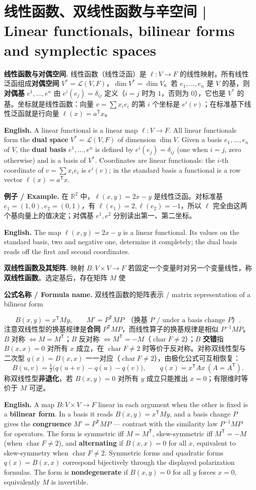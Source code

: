 \documentclass[UTF8,11pt,a4paper]{ctexart}
\newcommand{\EN}[1]{\par\noindent\textbf{English.} #1\par}
\newcommand{\FORMULA}[2]{\par\noindent\textbf{公式名称 / Formula name.} #1 / #2\par}
\newcommand{\EX}[2]{\par\noindent\textbf{例子 / Example.} #1\par\EN{#2}}
\begin{document}
\section[线性函数与辛空间]{线性函数、双线性函数与辛空间 | Linear functionals, bilinear forms and symplectic spaces}
\noindent\textbf{线性函数与对偶空间.} 线性函数（线性泛函）是 $\ell:V\to F$ 的线性映射。所有线性泛函组成\textbf{对偶空间} $V^*=\mathcal L(V,F)$，$\dim V^*=\dim V$。若 $e_1,\dots,e_n$ 是 $V$ 的基，则\textbf{对偶基} $e^1,\dots,e^n$ 由 $e^i(e_j)=\delta_{ij}$ 定义（$i=j$ 时为 $1$，否则为 $0$），它也是 $V^*$ 的基。坐标就是线性函数：向量 $v=\sum x_ie_i$ 的第 $i$ 个坐标是 $e^i(v)$；在标准基下线性泛函就是行向量 $\ell(x)=a^{\mathsf T}x$。
\EN{A linear functional is a linear map $\ell:V\to F$. All linear functionals form the \textbf{dual space} $V^*=\mathcal L(V,F)$ of dimension $\dim V$. Given a basis $e_1,\dots,e_n$ of $V$, the \textbf{dual basis} $e^1,\dots,e^n$ is defined by $e^i(e_j)=\delta_{ij}$ (one when $i=j$, zero otherwise) and is a basis of $V^*$. Coordinates are linear functionals: the $i$-th coordinate of $v=\sum x_ie_i$ is $e^i(v)$; in the standard basis a functional is a row vector $\ell(x)=a^{\mathsf T}x$.}
\EX{在 $\mathbb R^2$ 中，$\ell(x,y)=2x-y$ 是线性泛函。对标准基 $e_1=(1,0),e_2=(0,1)$，有 $\ell(e_1)=2,\ell(e_2)=-1$，所以 $\ell$ 完全由这两个基向量上的值决定；对偶基 $e^1,e^2$ 分别读出第一、第二坐标。}{The map $\ell(x,y)=2x-y$ is a linear functional. Its values on the standard basis, two and negative one, determine it completely; the dual basis reads off the first and second coordinates.}
\noindent\textbf{双线性函数及其矩阵.} 映射 $B:V\times V\to F$ 若固定一个变量时对另一个变量线性，称\textbf{双线性函数}。选定基后，存在矩阵 $M$ 使
\FORMULA{双线性函数的矩阵表示}{matrix representation of a bilinear form}
\[
B(x,y)=x^{\mathsf T}My,\qquad
M'=P^{\mathsf T}MP\ \ \text{（换基 $P$ / under a basis change $P$）}.
\]
注意双线性型的换基规律是\textbf{合同} $P^{\mathsf T}MP$，而线性算子的换基规律是相似 $P^{-1}MP$。$B$ 对称 $\iff M=M^{\mathsf T}$；$B$ 反对称 $\iff M^{\mathsf T}=-M$（$\operatorname{char}F\ne2$）；$B$ \textbf{交错}指 $B(x,x)=0$ 对所有 $x$ 成立，在 $\operatorname{char}F\ne2$ 时等价于反对称。对称双线性型与二次型 $q(x)=B(x,x)$ 一一对应（$\operatorname{char}F\ne2$），由极化公式可互相恢复：
\[
B(u,v)=\tfrac12\bigl(q(u+v)-q(u)-q(v)\bigr),\qquad
q(x)=x^{\mathsf T}Ax\ (A=A^{\mathsf T}).
\]
称双线性型\textbf{非退化}，若 $B(x,y)=0$ 对所有 $y$ 成立只能推出 $x=0$；有限维时等价于 $M$ 可逆。
\EN{A map $B:V\times V\to F$ linear in each argument when the other is fixed is a \textbf{bilinear form}. In a basis it reads $B(x,y)=x^{\mathsf T}My$, and a basis change $P$ gives the \textbf{congruence} $M'=P^{\mathsf T}MP$ --- contrast with the similarity law $P^{-1}MP$ for operators. The form is symmetric iff $M=M^{\mathsf T}$, skew-symmetric iff $M^{\mathsf T}=-M$ (when $\operatorname{char}F\ne2$), and \textbf{alternating} if $B(x,x)=0$ for all $x$, equivalent to skew-symmetry when $\operatorname{char}F\ne2$. Symmetric forms and quadratic forms $q(x)=B(x,x)$ correspond bijectively through the displayed polarization formulas. The form is \textbf{nondegenerate} if $B(x,y)=0$ for all $y$ forces $x=0$, equivalently $M$ is invertible.}
\end{document}
